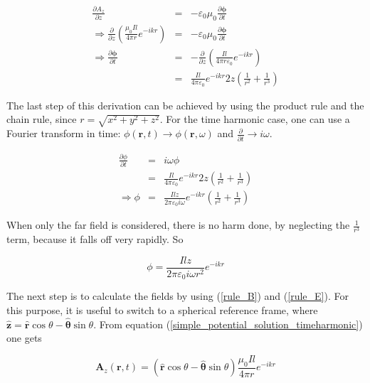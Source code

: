 \documentclass[a4paper,11pt]{report}
\begin{document}
\begin{eqnarray}
\frac{\partial A_z }{\partial z}&=&-\varepsilon_0 \mu_0\frac{\partial \mathbf{\phi}}{\partial t} \label{lorenz_simplified} \\
\Rightarrow \frac{\partial }{\partial z} \left(  \frac{ \mu_0 I l}{4 \pi r} e^{-ikr } \right) &=&-\varepsilon_0 \mu_0\frac{\partial \mathbf{\phi}}{\partial t} \nonumber \\
\Rightarrow \frac{\partial \mathbf{\phi}}{\partial t} &=&-  \frac{\partial }{\partial z} \left(  \frac{ I l}{4 \pi r \varepsilon_0} e^{-ikr } \right)  \nonumber\\
&=&  \frac{ I l}{4 \pi \varepsilon_0} e^{-ikr } 2z \left( \frac{1}{r^2} + \frac{1}{r^3} \right) \label{diff_eq_scalar_pot}
\end{eqnarray}


The last step of this derivation can be achieved by using the product rule and the chain rule, since $r=\sqrt{x^2+y^2+z^2}$. For the time harmonic case, one can use a Fourier transform in time: $\phi (\mathbf{r},t) \rightarrow \phi (\mathbf{r},\omega)$ and $\frac{\partial }{\partial t} \rightarrow i \omega$.

\begin{eqnarray}
\frac{\partial \phi}{\partial t} &=& i \omega \phi\\
&=& \frac{ I l}{4 \pi \varepsilon_0} e^{-ikr } 2z \left( \frac{1}{r^2} + \frac{1}{r^3} \right)  \nonumber \\
\Rightarrow \phi &=& \frac{ I l z}{2 \pi \varepsilon_0 i \omega} e^{-ikr } \left( \frac{1}{r^2} + \frac{1}{r^3} \right) \label{solution_scalar_pot_hd}
\end{eqnarray}

When only the far field is considered, there is no harm done, by neglecting the $\frac{1}{r^3}$ term, because it falls off very rapidly. So

\begin{equation}\label{solution_scalar_pot_hd_ff}
\phi = \frac{ I l z}{2 \pi \varepsilon_0 i \omega r^2} e^{-ikr }
\end{equation}

The next step is to calculate the fields by using (\ref{rule_B}) and (\ref{rule_E}). For this purpose, it is useful to switch to a spherical reference frame, where $\mathbf{\hat{z}}=\mathbf{\hat{r}} \cos \theta - \mathbf{\hat{\theta}} \sin \theta$. From equation (\ref{simple_potential_solution_timeharmonic}) one gets

\begin{equation}\label{simple_potential_solution_timeharmonic_sherical_ref}
 \mathbf{A}_z (\mathbf{r},t) = (\mathbf{\hat{r}} \cos \theta - \mathbf{\hat{\theta}} \sin \theta) \frac{\mu_0 I l}{4 \pi r} e^{-ikr }
\end{equation}
\end{document}
